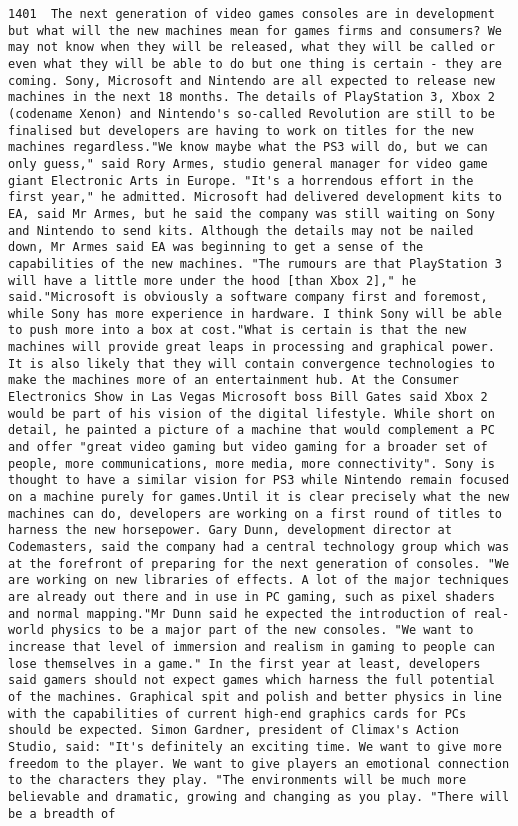 \documentclass[11pt]{article}
\begin{document}
\begin{Verbatim}[commandchars=\\\{\}]
         1401  The next generation of video games consoles are in development but what will the new machines mean for games firms and consumers? We may not know when they will be released, what they will be called or even what they will be able to do but one thing is certain - they are coming. Sony, Microsoft and Nintendo are all expected to release new machines in the next 18 months. The details of PlayStation 3, Xbox 2 (codename Xenon) and Nintendo's so-called Revolution are still to be finalised but developers are having to work on titles for the new machines regardless."We know maybe what the PS3 will do, but we can only guess," said Rory Armes, studio general manager for video game giant Electronic Arts in Europe. "It's a horrendous effort in the first year," he admitted. Microsoft had delivered development kits to EA, said Mr Armes, but he said the company was still waiting on Sony and Nintendo to send kits. Although the details may not be nailed down, Mr Armes said EA was beginning to get a sense of the capabilities of the new machines. "The rumours are that PlayStation 3 will have a little more under the hood [than Xbox 2]," he said."Microsoft is obviously a software company first and foremost, while Sony has more experience in hardware. I think Sony will be able to push more into a box at cost."What is certain is that the new machines will provide great leaps in processing and graphical power. It is also likely that they will contain convergence technologies to make the machines more of an entertainment hub. At the Consumer Electronics Show in Las Vegas Microsoft boss Bill Gates said Xbox 2 would be part of his vision of the digital lifestyle. While short on detail, he painted a picture of a machine that would complement a PC and offer "great video gaming but video gaming for a broader set of people, more communications, more media, more connectivity". Sony is thought to have a similar vision for PS3 while Nintendo remain focused on a machine purely for games.Until it is clear precisely what the new machines can do, developers are working on a first round of titles to harness the new horsepower. Gary Dunn, development director at Codemasters, said the company had a central technology group which was at the forefront of preparing for the next generation of consoles. "We are working on new libraries of effects. A lot of the major techniques are already out there and in use in PC gaming, such as pixel shaders and normal mapping."Mr Dunn said he expected the introduction of real-world physics to be a major part of the new consoles. "We want to increase that level of immersion and realism in gaming to people can lose themselves in a game." In the first year at least, developers said gamers should not expect games which harness the full potential of the machines. Graphical spit and polish and better physics in line with the capabilities of current high-end graphics cards for PCs should be expected. Simon Gardner, president of Climax's Action Studio, said: "It's definitely an exciting time. We want to give more freedom to the player. We want to give players an emotional connection to the characters they play. "The environments will be much more believable and dramatic, growing and changing as you play. "There will be a breadth of 
\end{Verbatim}
\end{document}
